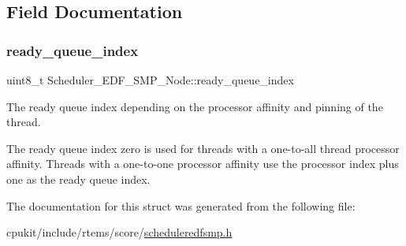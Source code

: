 \subsection{Field Documentation}
\mbox{\label{structScheduler__EDF__SMP__Node_af21e25f978153eb60b6c7b032f771f15}} 
\subsubsection{\texorpdfstring{ready\_queue\_index}{ready\_queue\_index}}
{\footnotesize\ttfamily uint8\+\_\+t Scheduler\+\_\+\+E\+D\+F\+\_\+\+S\+M\+P\+\_\+\+Node\+::ready\+\_\+queue\+\_\+index}



The ready queue index depending on the processor affinity and pinning of the thread. 

The ready queue index zero is used for threads with a one-\/to-\/all thread processor affinity. Threads with a one-\/to-\/one processor affinity use the processor index plus one as the ready queue index. 

The documentation for this struct was generated from the following file\+:\begin{DoxyCompactItemize}
\item 
cpukit/include/rtems/score/\mbox{\hyperlink{scheduleredfsmp_8h}{scheduleredfsmp.\+h}}\end{DoxyCompactItemize}
